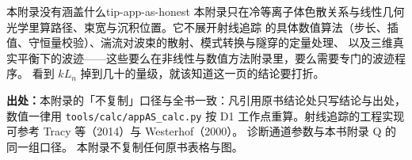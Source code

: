 \begin{tip}{本附录没有涵盖什么}{tip-app-as-honest}
本附录只在冷等离子体色散关系与线性几何光学里算路径、束宽与沉积位置。它不展开射线追踪
的具体数值算法（步长、插值、守恒量校验）、湍流对波束的散射、模式转换与隧穿的定量处理、
以及三维真实平衡下的波迹——这些要么在非线性与数值方法附录里，要么需要专门的波迹程序。
看到 $kL_n$ 掉到几十的量级，就该知道这一页的结论要打折。
\end{tip}

\textbf{出处：}本附录的「不复制」口径与全书一致：凡引用原书结论处只写结论与出处，
数值一律用 \texttt{tools/\allowbreak{}calc/\allowbreak{}appAS\_calc.py} 按 D1 工作点重算。射线追踪的工程实现可参考
Tracy 等（2014）与 Westerhof（2000）。
诊断通道参数与本书附录 Q 的同一组口径。
本附录不复制任何原书表格与图。
\endgroup